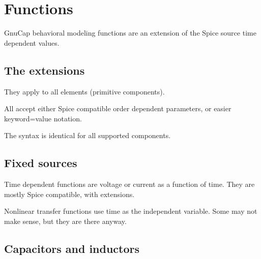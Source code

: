 %
%
%
%
\section{Functions}

GnuCap behavioral modeling functions are an extension of the Spice source
time dependent values.
\subsection{The extensions}

They apply to all elements (primitive components).

All accept either Spice compatible order dependent parameters, or
easier keyword=value notation.

The syntax is identical for all supported components.
\subsection{Fixed sources}

Time dependent functions are voltage or current as a function of time.
They are mostly Spice compatible, with extensions.

Nonlinear transfer functions use time as the independent variable.
Some may not make sense, but they are there anyway.
\subsection{Capacitors and inductors}

